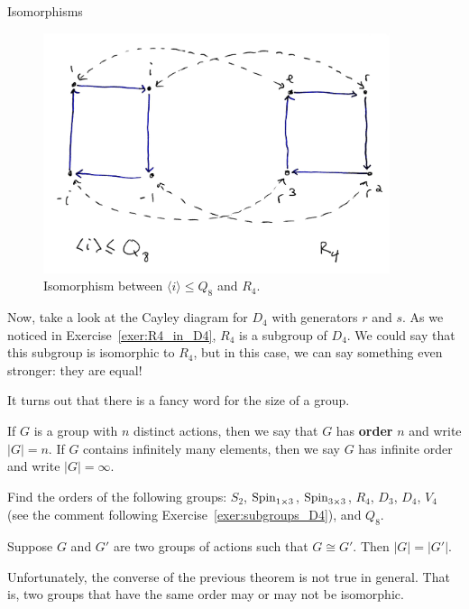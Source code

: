 \begin{section}{Isomorphisms}
\begin{figure}\label{fig:isoR4}
\begin{center}
\includegraphics[width=4in]{isoR4.png}
\end{center}
\caption{Isomorphism between $\langle i\rangle\leq Q_8$ and $R_4$.}
\end{figure}

Now, take a look at the Cayley diagram for $D_4$ with generators $r$ and $s$.  As we noticed in Exercise~\ref{exer:R4_in_D4}, $R_4$ is a subgroup of $D_4$.  We could say that this subgroup is isomorphic to $R_4$, but in this case, we can say something even stronger: they are equal!

It turns out that there is a fancy word for the size of a group.

\begin{definition}
If $G$ is a group with $n$ distinct actions, then we say that $G$ has \textbf{order} $n$ and write $|G|=n$.  If $G$ contains infinitely many elements, then we say $G$ has infinite order and write $|G|=\infty$.
\end{definition}

\begin{exercise}
Find the orders of the following groups: $S_2$, $\operatorname{Spin}_{1\times 3}$, $\operatorname{Spin}_{3\times 3}$, $R_4$, $D_3$, $D_4$, $V_4$ (see the comment following Exercise~\ref{exer:subgroups_D4}), and $Q_8$.
\end{exercise}

\begin{theorem}
Suppose $G$ and $G'$ are two groups of actions such that $G\cong G'$.  Then $|G|=|G'|$.
\end{theorem}

Unfortunately, the converse of the previous theorem is not true in general.  That is, two groups that have the same order may or may not be isomorphic.  


\end{section}
